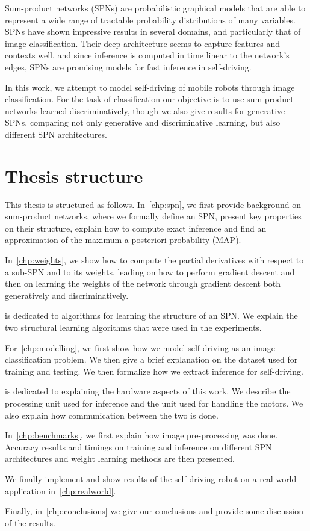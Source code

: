 Sum-product networks (SPNs) are probabilistic graphical models that are able to represent a wide
range of tractable probability distributions of many variables. SPNs have shown impressive results
in several domains, and particularly that of image classification. Their deep architecture seems to
capture features and contexts well, and since inference is computed in time linear to the network's
edges, SPNs are promising models for fast inference in self-driving.

In this work, we attempt to model self-driving of mobile robots through image classification. For
the task of classification our objective is to use sum-product networks learned discriminatively,
though we also give results for generative SPNs, comparing not only generative and discriminative
learning, but also different SPN architectures.

\section{Thesis structure}

This thesis is structured as follows. In~\autoref{chp:spn}, we first provide background on
sum-product networks, where we formally define an SPN, present key properties on their structure,
explain how to compute exact inference and find an approximation of the maximum a posteriori
probability (MAP).

In~\autoref{chp:weights}, we show how to compute the partial derivatives with respect to a sub-SPN
and to its weights, leading on how to perform gradient descent and then on learning the weights of
the network through gradient descent both generatively and discriminatively.

 is dedicated to algorithms for learning the structure of an SPN\@. We explain
the two structural learning algorithms that were used in the experiments.

For~\autoref{chp:modelling}, we first show how we model self-driving as an image classification
problem. We then give a brief explanation on the dataset used for training and testing. We then
formalize how we extract inference for self-driving.

 is dedicated to explaining the hardware aspects of this work. We describe the
processing unit used for inference and the unit used for handling the motors. We also explain how
communication between the two is done.

In~\autoref{chp:benchmarks}, we first explain how image pre-processing was done. Accuracy results
and timings on training and inference on different SPN architectures and weight learning methods
are then presented.

We finally implement and show results of the self-driving robot on a real world application
in~\autoref{chp:realworld}.

Finally, in~\autoref{chp:conclusions} we give our conclusions and provide some discussion of the
results.


